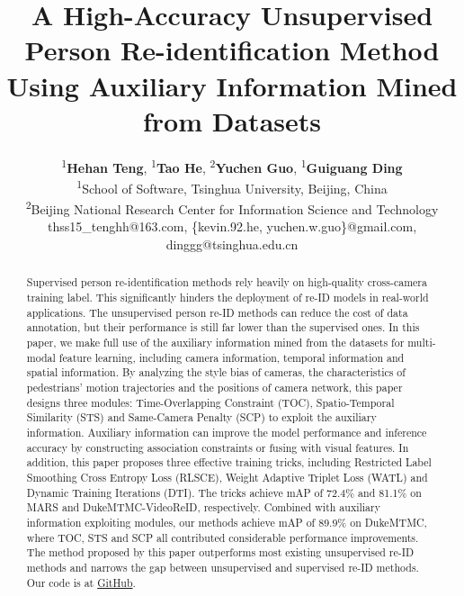 \documentclass[10pt,twocolumn,letterpaper]{article}
\begin{document}
\title{A High-Accuracy Unsupervised Person Re-identification Method Using Auxiliary Information Mined from Datasets}

\author{\textsuperscript{1}\textbf{Hehan Teng}, \textsuperscript{1}\textbf{Tao He}, \textsuperscript{2}\textbf{Yuchen Guo}, \textsuperscript{1}\textbf{Guiguang Ding} \\
 \textsuperscript{1}School of Software, Tsinghua University, Beijing, China \\
 \textsuperscript{2}Beijing National Research Center for Information Science and Technology \\
{\small thss15\_tenghh@163.com, \{kevin.92.he, yuchen.w.guo\}@gmail.com, dinggg@tsinghua.edu.cn}
}

\maketitle
\ificcvfinal\thispagestyle{empty}\fi

\begin{abstract}

Supervised person re-identification methods rely heavily on high-quality cross-camera training label. This significantly hinders the deployment of re-ID models in real-world applications. The unsupervised person re-ID methods can reduce the cost of data annotation, but their performance is still far lower than the supervised ones. In this paper, we make full use of the auxiliary information mined from the datasets for multi-modal feature learning, including camera information, temporal information and spatial information. By analyzing the style bias of cameras, the characteristics of pedestrians' motion trajectories and the positions of camera network, this paper designs three modules: Time-Overlapping Constraint (TOC), Spatio-Temporal Similarity (STS) and Same-Camera Penalty (SCP) to exploit the auxiliary information. Auxiliary information can improve the model performance and inference accuracy by constructing association constraints or fusing with visual features. In addition, this paper proposes three effective training tricks, including Restricted Label Smoothing Cross Entropy Loss (RLSCE), Weight Adaptive Triplet Loss (WATL) and Dynamic Training Iterations (DTI). The tricks achieve mAP of 72.4\% and 81.1\% on MARS and DukeMTMC-VideoReID, respectively. Combined with auxiliary information exploiting modules, our methods achieve mAP of 89.9\% on DukeMTMC, where TOC, STS and SCP all contributed considerable performance improvements. The method proposed by this paper outperforms most existing unsupervised re-ID methods and narrows the gap between unsupervised and supervised re-ID methods. Our code is at \href{https://github.com/tenghehan/AuxUSLReID}{GitHub}.

\end{abstract}
\end{document}
